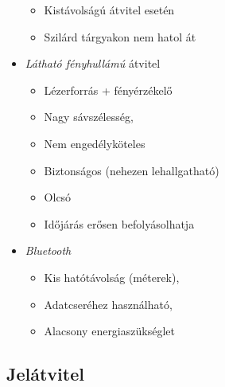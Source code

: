 \documentclass[12pt]{article}
\begin{document}
\begin{itemize}[leftmargin=7.5mm]
\begin{itemize}[leftmargin=7.5mm]
            \renewcommand{\labelitemii}{$\vcenter{\hbox{\tiny$\circ$}}$}
            \item Kistávolságú átvitel esetén
            \item Szilárd tárgyakon nem hatol át
        \end{itemize}
        \item \emph{Látható fényhullámú} átvitel
    	\begin{itemize}[leftmargin=7.5mm]
            \renewcommand{\labelitemii}{$\vcenter{\hbox{\tiny$\circ$}}$}
            \item Lézerforrás + fényérzékelő
            \item Nagy sávszélesség,
            \item Nem engedélyköteles
            \item Biztonságos (nehezen lehallgatható)
            \item Olcsó \\
            \item Időjárás erősen befolyásolhatja
        \end{itemize}
        \item \emph{Bluetooth}
        \begin{itemize}[leftmargin=7.5mm]
            \renewcommand{\labelitemii}{$\vcenter{\hbox{\tiny$\circ$}}$}
            \item Kis hatótávolság (méterek),
            \item Adatcseréhez használható,
            \item Alacsony energiaszükséglet
        \end{itemize}
    \end{itemize}

	\subsection*{Jelátvitel\\}
\end{document}
